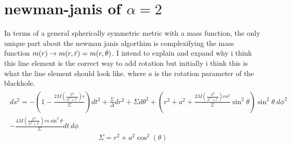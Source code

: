 \documentclass[a4paper,11pt]{article}
\begin{document}
\section{newman-janis of $\alpha = 2$}
In terms of a general spherically symmetric metric with a mass function, the only unique part about the newman janis algorthim is complexifying the mass function $m(r) \rightarrow m(r,\Bar{r})=m(r,\theta)$. I intend to explain and expand why i think this line element is the correct way to add rotation but initially i think this is what the line element should look like. where $a$ is the rotation parameter of the blackhole.
\centering
\begin{multline*}
{\displaystyle {\begin{aligned} ds^{2}=-\left(1-{\frac {2M(\frac{\Sigma^{2}}{\Sigma^{2}+l^4})r}{\Sigma }}\right)dt^{2}+{\frac {\Sigma }{\Delta }}dr^{2}+\Sigma d\theta ^{2}+\left(r^{2}+a^{2}+{\frac {2M(\frac{\Sigma^{2}}{\Sigma^{2}+l^4})ra^{2}}{\Sigma }}\sin ^{2}\theta \right)\sin ^{2}\theta \ d\phi ^{2} &\\ -{\frac {4M(\frac{\Sigma^{2}}{\Sigma^{2}+l^4})ra\sin ^{2}\theta }{\Sigma }}dt\,d\phi \end{aligned}}}	
\end{multline*}	
\begin{equation*}
\Sigma = r^2 +a^2\cos^2(\theta)
\end{equation*}
\end{document}
